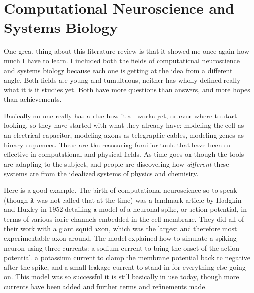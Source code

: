 \documentclass[12pt]{article}
\begin{document}
\maketitle

\section{Computational Neuroscience and Systems Biology}

One great thing about this literature review is that it showed me once again how much I have to learn.  I included both the fields of computational neuroscience and systems biology because each one is getting at the idea from a different angle.  Both fields are young and tumultuous, neither has wholly defined really what it is it studies yet.  Both have more questions than answers, and more hopes than achievements.  

Basically no one really has a clue how it all works yet, or even where to start looking, so they have started with what they already have:  modeling the cell as an electrical capacitor, modeling axons as telegraphic cables, modeling genes as binary sequences.  These are the reassuring familiar tools that have been so effective in computational and physical fields.  As time goes on though the tools are adapting to the subject, and people are discovering how \emph{different} these systems are from the idealized systems of physics and chemistry.  

Here is a good example.  The birth of computational neuroscience so to speak (though it was not called that at the time) was a landmark article by Hodgkin and Huxley \cite{Hodgkin} in 1952 detailing a model of a neuronal spike, or action potential, in terms of various ionic channels embedded in the cell membrane.  They did all of their work with a giant squid axon, which was the largest and therefore most experimentable axon around.  The model explained how to simulate a spiking neuron using three currents: a sodium current to bring the onset of the action potential, a potassium current to clamp the membrane potential back to negative after the spike, and a small leakage current to stand in for everything else going on.  This model was so successful it is still basically in use today, though more currents have been added and further terms and refinements made.  
\end{document}
